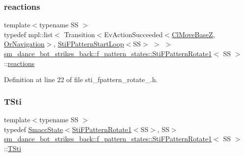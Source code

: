 \subsubsection{\texorpdfstring{reactions}{reactions}}
{\footnotesize\ttfamily template$<$typename SS $>$ \\
typedef mpl\+::list$<$ Transition$<$Ev\+Action\+Succeeded$<$\hyperlink{classcl__move__base__z_1_1ClMoveBaseZ}{Cl\+Move\+BaseZ}, \hyperlink{classsm__dance__bot__strikes__back_1_1OrNavigation}{Or\+Navigation}$>$, \hyperlink{structsm__dance__bot__strikes__back_1_1f__pattern__states_1_1StiFPatternStartLoop}{Sti\+F\+Pattern\+Start\+Loop}$<$SS$>$ $>$ $>$ \hyperlink{structsm__dance__bot__strikes__back_1_1f__pattern__states_1_1StiFPatternRotate1}{sm\+\_\+dance\+\_\+bot\+\_\+strikes\+\_\+back\+::f\+\_\+pattern\+\_\+states\+::\+Sti\+F\+Pattern\+Rotate1}$<$ SS $>$\+::\hyperlink{structsm__dance__bot__strikes__back_1_1f__pattern__states_1_1StiFPatternRotate1_aba05d27680e46c9e1c82162fef32ad32}{reactions}}



Definition at line 22 of file sti\+\_\+fpattern\+\_\+rotate\+\_.\+h.

\mbox{\label{structsm__dance__bot__strikes__back_1_1f__pattern__states_1_1StiFPatternRotate1_ac35c904f7bbee9538b86251490407684}} 
\subsubsection{\texorpdfstring{T\+Sti}{TSti}}
{\footnotesize\ttfamily template$<$typename SS $>$ \\
typedef \hyperlink{classSmaccState}{Smacc\+State}$<$\hyperlink{structsm__dance__bot__strikes__back_1_1f__pattern__states_1_1StiFPatternRotate1}{Sti\+F\+Pattern\+Rotate1}$<$SS$>$, SS$>$ \hyperlink{structsm__dance__bot__strikes__back_1_1f__pattern__states_1_1StiFPatternRotate1}{sm\+\_\+dance\+\_\+bot\+\_\+strikes\+\_\+back\+::f\+\_\+pattern\+\_\+states\+::\+Sti\+F\+Pattern\+Rotate1}$<$ SS $>$\+::\hyperlink{structsm__dance__bot__strikes__back_1_1f__pattern__states_1_1StiFPatternRotate1_ac35c904f7bbee9538b86251490407684}{T\+Sti}}



